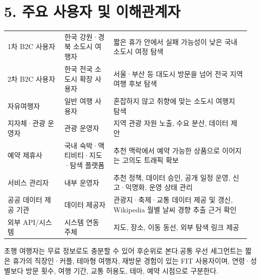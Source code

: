 \documentclass[12pt,a4paper]{article}
\newcommand{\DocNeedspace}[1]{\par\ifdim\dimexpr\pagegoal-\pagetotal\relax<#1\newpage\fi}
\renewcommand{\arraystretch}{1.35}
\newcommand{\TocNoChildTight}{\vspace{-0.28em}}
\begin{document}
\newpage

\DocNeedspace{10\baselineskip}
\section*{5. 주요 사용자 및 이해관계자}
\addtocontents{toc}{\protect\TocNoChildTight}


\DocNeedspace{22\baselineskip}
\begin{small}
\setlength{\tabcolsep}{3pt}
\setlength{\extrarowheight}{1pt}
\renewcommand{\arraystretch}{1.42}
\begin{longtable}{@{}>{\RaggedRight\arraybackslash}m{0.225\linewidth}>{\RaggedRight\arraybackslash}m{0.196\linewidth}>{\RaggedRight\arraybackslash}m{0.538\linewidth}@{}}
\toprule
\multicolumn{1}{>{\centering\arraybackslash}m{0.225\linewidth}}{\textbf{구분}} & \multicolumn{1}{>{\centering\arraybackslash}m{0.196\linewidth}}{\textbf{역할}} & \multicolumn{1}{>{\centering\arraybackslash}m{0.538\linewidth}}{\textbf{주요 니즈}} \\
\midrule
\endhead
1차 B2C 사용자 & 한국 강원·경북 소도시 여행자 & 짧은 휴가 안에서 실패 가능성이 낮은 국내 소도시 여정 탐색 \\
2차 B2C 사용자 & 한국 전국 소도시 확장 사용자 & 서울·부산 등 대도시 방문을 넘어 전국 지역 여행 후보 탐색 \\
자유여행자 & 일반 여행 사용자 & 혼잡하지 않고 취향에 맞는 소도시 여행지 탐색 \\
지자체·관광 운영자 & 관광 운영자 & 지역 관광 자원 노출, 수요 분산, 데이터 제안 \\
예약 제휴사 & 국내 숙박·액티비티·지도·탐색 플랫폼 & 추천 맥락에서 예약 가능한 상품으로 이어지는 고의도 트래픽 확보 \\
서비스 관리자 & 내부 운영자 & 추천 정책, 데이터 승인, 공개 일정 운영, 신고·익명화, 운영 상태 관리 \\
공공 데이터 제공 기관 & 데이터 제공자 & 관광지·축제·교통 데이터 제공 및 갱신, Wikipedia 월별 날씨 경향 추출 근거 확인 \\
외부 API/시스템 & 시스템 연동 주체 & 지도, 장소, 이동 동선, 외부 탐색 링크 제공 \\
\bottomrule
\end{longtable}
\end{small}


\DocNeedspace{3\baselineskip}
초행 여행자는 무료 정보로도 충분할 수 있어 후순위로 본다.\newline 공통 우선 세그먼트는 짧은 휴가의 직장인·커플, 테마형 여행자, 재방문 경험이 있는 FIT 사용자이며, 연령·성별보다 방문 횟수, 여행 기간, 교통 허용도, 테마, 예약 시점으로 구분한다.
\end{document}

